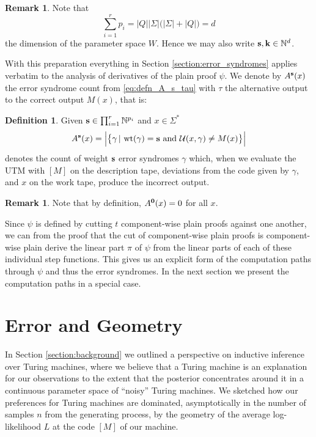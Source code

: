 \documentclass[english,letter paper,12pt,reqno]{article}
\theoremstyle{definition}
\newtheorem{definition}[theorem]{Definition}
\newtheorem{remark}[theorem]{Remark}
\def\be{\begin{equation}}
\def\ee{\end{equation}}
\def\l{\,|\,}
\begin{document}
\begin{remark}\label{remark:s_in_Nd}
Note that
\[
\sum_{i=1}^r p_i = |Q||\Sigma|\big( |\Sigma| + |Q| ) = d
\]
the dimension of the parameter space $W$. Hence we may also write $\bold{s}, \bold{k} \in \mathbb{N}^d$.
\end{remark}

With this preparation everything in Section \ref{section:error_syndromes} applies verbatim to the analysis of derivatives of the plain proof $\psi$. We denote by $A^{\bold{s}}(x)$ the error syndrome count from \eqref{eq:defn_A_s_tau} with $\tau$ the alternative output to the correct output $M(x)$, that is:

\begin{definition}\label{defn:Asfunctions} Given $\bold{s} \in \prod_{i=1}^r \mathbb{N}^{p_i}$ and $x \in \Sigma^*$
\be
A^{\bold{s}}(x) = \Big| \big\{ \gamma \l \operatorname{wt}(\gamma) = \bold{s} \text{ and } \mathcal{U}(x,\gamma) \neq M(x) \big\} \Big|
\ee
denotes the count of weight $\bold{s}$ error syndromes $\gamma$ which, when we evaluate the UTM with $[M]$ on the description tape, deviations from the code given by $\gamma$, and $x$ on the work tape, produce the incorrect output.
\end{definition}

\begin{remark}\label{remark:A_s_zero}
Note that by definition, $A^{\bold{0}}(x) = 0$ for all $x$.
\end{remark}

Since $\psi$ is defined by cutting $t$ component-wise plain proofs against one another, we can from the proof that the cut of component-wise plain proofs is component-wise plain \cite[Proposition 3.6]{clift2020encodings} derive the linear part $\pi$ of $\psi$ from the linear parts of each of these individual step functions. This gives us an explicit form of the computation paths through $\psi$ and thus the error syndromes. In the next section we present the computation paths in a special case.

\section{Error and Geometry}
\label{sec:GeometryofInductiveInference}

In Section \ref{section:background} we outlined a perspective on inductive inference over Turing machines, where we believe that a Turing machine is an explanation for our observations to the extent that the posterior concentrates around it in a continuous parameter space of ``noisy'' Turing machines. We sketched how our preferences for Turing machines are dominated, asymptotically in the number of samples $n$ from the generating process, by the geometry of the average log-likelihood $L$ at the code $[M]$ of our machine. 
\end{document}
